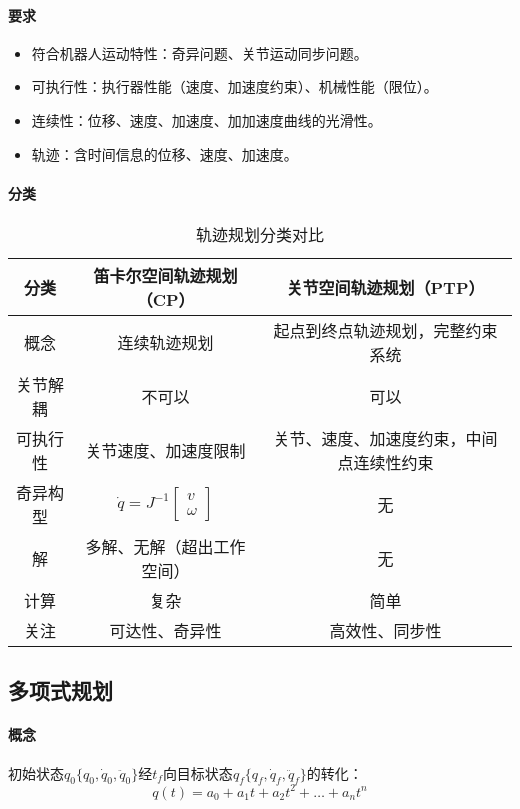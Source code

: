 \documentclass[
12pt, %
a4paper, 
oneside, %
headinclude,footinclude, %
]{scrartcl}
\begin{document}
\paragraph{要求}
\begin{itemize}
\item 符合机器人运动特性：奇异问题、关节运动同步问题。
\item 可执行性：执行器性能（速度、加速度约束）、机械性能（限位）。
\item 连续性：位移、速度、加速度、加加速度曲线的光滑性。
\item 轨迹：含时间信息的位移、速度、加速度。
\end{itemize}
\paragraph{分类}
\begin{table}[H]
\centering
\begin{tabular}{c|c|c}
\hline
分类 & 笛卡尔空间轨迹规划（CP） & 关节空间轨迹规划（PTP） \\
\hline
概念 & 连续轨迹规划 & 起点到终点轨迹规划，完整约束系统 \\
关节解耦 & 不可以 & 可以 \\
可执行性 & 关节速度、加速度限制 & 关节、速度、加速度约束，中间点连续性约束 \\
奇异构型 & $ \dot{q} = J^{-1} \begin{bmatrix} v \\ \omega \end{bmatrix} $ & 无 \\
解 & 多解、无解（超出工作空间） & 无 \\
计算 & 复杂 & 简单 \\
关注 & 可达性、奇异性 & 高效性、同步性 \\
\hline
\end{tabular}
\caption{轨迹规划分类对比}
\end{table}
\subsection[多项式规划]{多项式规划}
\paragraph{概念}
初始状态$ q_0\{q_0, \dot{q}_0, \ddot{q}_0\} $经$ t_f $向目标状态$ q_f\{q_f, \dot{q}_f, \ddot{q}_f\} $的转化：
$$ q(t) = a_0 + a_1 t + a_2 t^2 + \dots + a_n t^n $$
\end{document}
